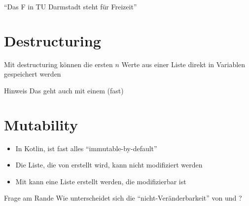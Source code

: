 \begin{frame}
    \slidehead
    \pause
    \vspace{1em}
    \begin{center}
        \enquote{Das F in TU Darmstadt steht für Freizeit}
    \end{center}
    \pause
    \vspace{1em}
\end{frame}

\livecoding

\section{Destructuring}\label{sec:destructuring}
\begin{frame}
    \slidehead
    Mit destructuring können die ersten $n$ Werte aus einer Liste direkt in Variablen gespeichert werden
    \pause
    \pause
    \begin{block}{Hinweis}
        Das geht auch mit einem  (fast)
    \end{block}
\end{frame}

\begin{frame}
    \slidehead
\end{frame}

\livecoding

\section{Mutability}
\begin{frame}
    \slidehead
    \begin{itemize}[<+->]
        \item In Kotlin, ist fast alles \enquote{immutable-by-default}
        \item Die Liste, die von  erstellt wird, kann nicht modifiziert werden
        \item Mit  kann eine Liste erstellt werden, die modifizierbar ist
    \end{itemize}
    \begin{block}{Frage am Rande}
        Wie unterscheidet sich die \enquote{nicht-Veränderbarkeit} von  und ?
    \end{block}
\end{frame}

